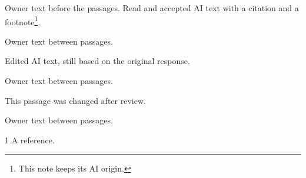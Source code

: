 \documentclass{article}
\begin{document}
Owner text before the passages.
Read and accepted AI text with a citation \cite{x} and a footnote\footnote{This note keeps its AI origin.}.

Owner text between passages.

Edited AI text, still based on the original response.

Owner text between passages.

This passage was changed after review.

Owner text between passages.

\begin{thebibliography}{1}
 A reference.
\end{thebibliography}
\AuthorshipSummary
\end{document}
